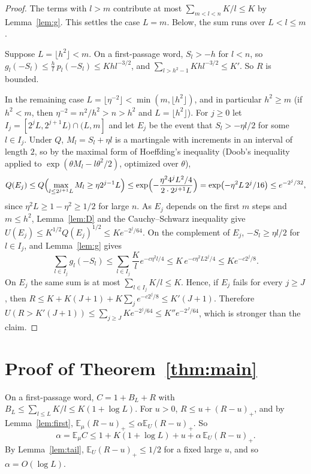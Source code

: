\documentclass[11pt]{amsart}
\theoremstyle{remark}
\numberwithin{equation}{section}
\newcommand{\EE}{\mathbb{E}}
\begin{document}
\begin{proof}
The terms with $l>m$ contribute at most $\sum_{m<l<n}K/l\le K$ by Lemma~\ref{lem:g}. This settles the case $L=m$. Below, the sum runs over $L<l\le m$.

Suppose $L=\lfloor h^2\rfloor<m$. On a first-passage word, $S_l>-h$ for $l<n$, so $g_l(-S_l)\le\frac hl\,p_l(-S_l)\le Khl^{-3/2}$, and $\sum_{l>h^2-1}Khl^{-3/2}\le K'$. So $R$ is bounded.

In the remaining case $L=\lfloor\eta^{-2}\rfloor<\min(m,\lfloor h^2\rfloor)$, and in particular $h^2\ge m$ (if $h^2<m$, then $\eta^{-2}=n^2/h^2>n>h^2$ and $L=\lfloor h^2\rfloor$). For $j\ge0$ let $I_j=[2^jL,2^{j+1}L)\cap(L,m]$ and let $E_j$ be the event that $S_l>-\eta l/2$ for some $l\in I_j$. Under $Q$, $M_l=S_l+\eta l$ is a martingale with increments in an interval of length $2$, so by the maximal form of Hoeffding's inequality (Doob's inequality applied to $\exp(\theta M_l-l\theta^2/2)$, optimized over $\theta$),
\[
Q(E_j)\le Q\Bigl(\max_{l\le2^{j+1}L}M_l\ge\eta2^{j-1}L\Bigr)\le\exp\Bigl(-\frac{\eta^2 4^{j}L^2/4}{2\cdot2^{j+1}L}\Bigr)=\exp\bigl(-\eta^2L\,2^{j}/16\bigr)\le e^{-2^j/32},
\]
since $\eta^2L\ge1-\eta^2\ge1/2$ for large $n$. As $E_j$ depends on the first $m$ steps and $m\le h^2$, Lemma~\ref{lem:D} and the Cauchy--Schwarz inequality give $U(E_j)\le K^{1/2}Q(E_j)^{1/2}\le Ke^{-2^j/64}$. On the complement of $E_j$, $-S_l\ge\eta l/2$ for $l\in I_j$, and Lemma~\ref{lem:g} gives
\[
\sum_{l\in I_j}g_l(-S_l)\le\sum_{l\in I_j}\frac Kle^{-c\eta^2l/4}\le K\,e^{-c\eta^2L2^j/4}\le Ke^{-c2^j/8}.
\]
On $E_j$ the same sum is at most $\sum_{l\in I_j}K/l\le K$. Hence, if $E_j$ fails for every $j\ge J$, then $R\le K+K(J+1)+K\sum_je^{-c2^j/8}\le K'(J+1)$. Therefore $U(R>K'(J+1))\le\sum_{j\ge J}Ke^{-2^j/64}\le K''e^{-2^J/64}$, which is stronger than the claim.
\end{proof}

\section{Proof of Theorem~\ref{thm:main}}\label{sec:proof}

On a first-passage word, $C=1+B_L+R$ with $B_L\le\sum_{l\le L}K/l\le K(1+\log L)$. For $u>0$, $R\le u+(R-u)_+$, and by Lemma~\ref{lem:first}, $\EE_\mu(R-u)_+\le\alpha\EE_U(R-u)_+$. So
\[
\alpha=\EE_\mu C\le1+K(1+\log L)+u+\alpha\,\EE_U(R-u)_+.
\]
By Lemma~\ref{lem:tail}, $\EE_U(R-u)_+\le1/2$ for a fixed large $u$, and so $\alpha=O(\log L)$.
\end{document}
